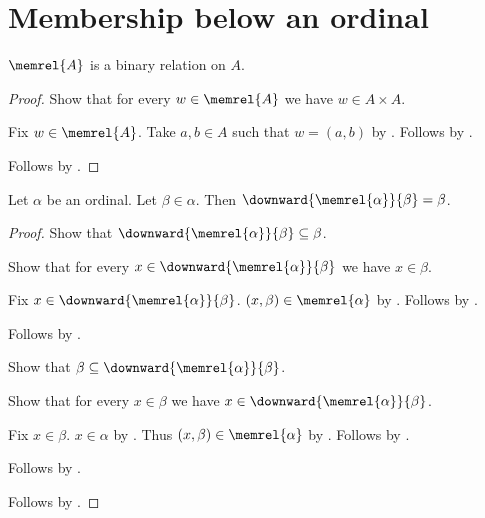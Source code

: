 


\section{Membership below an ordinal}

\begin{proposition}\label{memrel_is_binary_relation_on}
    $\memrel{A}$ is a binary relation on $A$.
\end{proposition}
\begin{proof}
    Show that for every $w\in\memrel{A}$ we have $w\in A\times A$.
    \begin{subproof}
        Fix $w\in\memrel{A}$.
        Take $a,b\in A$ such that $w=(a,b)$
            by .
        Follows by .
    \end{subproof}
    Follows by .
\end{proof}

\begin{lemma}\label{ordinal_memrel_downward}
    Let $\alpha$ be an ordinal.
    Let $\beta\in\alpha$.
    Then $\downward{\memrel{\alpha}}{\beta}=\beta$.
\end{lemma}
\begin{proof}
    Show that $\downward{\memrel{\alpha}}{\beta}\subseteq\beta$.
    \begin{subproof}
        Show that for every $x\in\downward{\memrel{\alpha}}{\beta}$
            we have $x\in\beta$.
        \begin{subproof}
            Fix $x\in\downward{\memrel{\alpha}}{\beta}$.
            $(x,\beta)\in\memrel{\alpha}$
                by .
            Follows by .
        \end{subproof}
        Follows by .
    \end{subproof}
    Show that $\beta\subseteq\downward{\memrel{\alpha}}{\beta}$.
    \begin{subproof}
        Show that for every $x\in\beta$ we have
            $x\in\downward{\memrel{\alpha}}{\beta}$.
        \begin{subproof}
            Fix $x\in\beta$.
            $x\in\alpha$ by .
            Thus $(x,\beta)\in\memrel{\alpha}$
                by .
            Follows by .
        \end{subproof}
        Follows by .
    \end{subproof}
    Follows by .
\end{proof}
